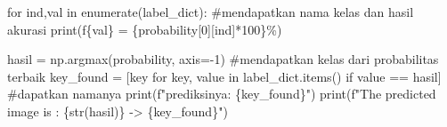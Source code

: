 \documentclass[
  letterpaper,
  DIV=11,
  numbers=noendperiod]{scrreprt}
\newenvironment{Shaded}{\begin{snugshade}}{\end{snugshade}}
\newcommand{\BuiltInTok}[1]{\textcolor[rgb]{0.00,0.23,0.31}{#1}}
\newcommand{\CommentTok}[1]{\textcolor[rgb]{0.37,0.37,0.37}{#1}}
\newcommand{\ControlFlowTok}[1]{\textcolor[rgb]{0.00,0.23,0.31}{#1}}
\newcommand{\DecValTok}[1]{\textcolor[rgb]{0.68,0.00,0.00}{#1}}
\newcommand{\KeywordTok}[1]{\textcolor[rgb]{0.00,0.23,0.31}{#1}}
\newcommand{\NormalTok}[1]{\textcolor[rgb]{0.00,0.23,0.31}{#1}}
\newcommand{\OperatorTok}[1]{\textcolor[rgb]{0.37,0.37,0.37}{#1}}
\newcommand{\SpecialCharTok}[1]{\textcolor[rgb]{0.37,0.37,0.37}{#1}}
\newcommand{\SpecialStringTok}[1]{\textcolor[rgb]{0.13,0.47,0.30}{#1}}
\begin{document}
\begin{Shaded}
\begin{Highlighting}[]
\ControlFlowTok{for}\NormalTok{ ind,val }\KeywordTok{in} \BuiltInTok{enumerate}\NormalTok{(label\_dict): }\CommentTok{\#mendapatkan nama kelas dan hasil akurasi}
    \BuiltInTok{print}\NormalTok{(}\SpecialStringTok{f\textquotesingle{}}\SpecialCharTok{\{}\NormalTok{val}\SpecialCharTok{\}}\SpecialStringTok{ = }\SpecialCharTok{\{}\NormalTok{probability[}\DecValTok{0}\NormalTok{][ind]}\OperatorTok{*}\DecValTok{100}\SpecialCharTok{\}}\SpecialStringTok{\%\textquotesingle{}}\NormalTok{)}
    
    
\NormalTok{hasil }\OperatorTok{=}\NormalTok{ np.argmax(probability, axis}\OperatorTok{={-}}\DecValTok{1}\NormalTok{) }\CommentTok{\#mendapatkan kelas dari probabilitas terbaik}
\NormalTok{key\_found }\OperatorTok{=}\NormalTok{ [key }\ControlFlowTok{for}\NormalTok{ key, value }\KeywordTok{in}\NormalTok{ label\_dict.items() }\ControlFlowTok{if}\NormalTok{ value }\OperatorTok{==}\NormalTok{ hasil] }\CommentTok{\#dapatkan namanya}
\BuiltInTok{print}\NormalTok{(}\SpecialStringTok{f"prediksinya: }\SpecialCharTok{\{}\NormalTok{key\_found}\SpecialCharTok{\}}\SpecialStringTok{"}\NormalTok{)}
\BuiltInTok{print}\NormalTok{(}\SpecialStringTok{f"The predicted image is : }\SpecialCharTok{\{}\BuiltInTok{str}\NormalTok{(hasil)}\SpecialCharTok{\}}\SpecialStringTok{ {-}\textgreater{} }\SpecialCharTok{\{}\NormalTok{key\_found}\SpecialCharTok{\}}\SpecialStringTok{"}\NormalTok{)}
\end{Highlighting}
\end{Shaded}
\end{document}
